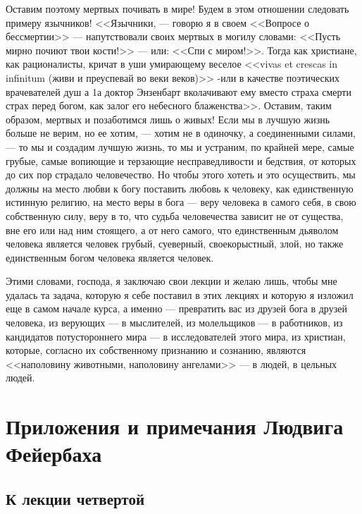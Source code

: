 \documentclass[12pt]{article}
\begin{document}
Оставим поэтому мертвых почивать в мире! Будем в этом отношении следовать примеру язычников! <<Язычники, --- говорю я в своем <<Вопросе о бессмертии>>  --- напутствовали своих мертвых в могилу словами: <<Пусть мирно почиют твои кости!>> --- или: <<Спи с миром!>>. Тогда как христиане, как рационалисты, кричат в уши умирающему веселое <<vivas et crescas in infinitum (живи и преуспевай во веки веков)>> -или в качестве поэтических врачевателей душ а 1а доктор Энзенбарт вколачивают ему вместо страха смерти страх перед богом, как залог его небесного блаженства>>. Оставим, таким образом, мертвых и позаботимся лишь о живых! Если мы в лучшую жизнь больше не верим, но ее хотим, --- хотим не в одиночку, а соединенными силами, --- то мы и создадим лучшую жизнь, то мы и устраним, по крайней мере, самые грубые, самые вопиющие и терзающие несправедливости и бедствия, от которых до сих пор страдало человечество. Но чтобы этого хотеть и это осуществить, мы должны на место любви к богу поставить любовь к человеку, как единственную истинную религию, на место веры в бога --- веру человека в самого себя, в свою собственную силу, веру в то, что судьба человечества зависит не от существа, вне его или над ним стоящего, а от него самого, что единственным дьяволом человека является человек грубый, суеверный, своекорыстный, злой, но также единственным богом человека является человек. 

Этими словами, господа, я заключаю свои лекции и желаю лишь, чтобы мне удалась та задача, которую я себе поставил в этих лекциях и которую я изложил еще в самом начале курса, а именно --- превратить вас из друзей бога в друзей человека, из верующих --- в мыслителей, из молельщиков --- в работников, из кандидатов потустороннего мира --- в исследователей этого мира, из христиан, которые, согласно их собственному признанию и сознанию, являются <<наполовину животными, наполовину ангелами>>  --- в людей, в цельных людей. 

\section*{Приложения и примечания Людвига Фейербаха}

\subsection*{К лекции четвертой}
\end{document}
